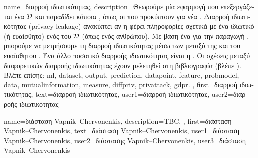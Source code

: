 {name={\foreignlanguage{greek}{διαρροή ιδιωτικότητας}},
	description={\foreignlanguage{greek}{Θεωρούμε μία εφαρμογή} 
		 \foreignlanguage{greek}{που επεξεργάζεται ένα}  $\mathcal{D}$ \foreignlanguage{greek}{και 
		παραδίδει κάποια} , \foreignlanguage{greek}{όπως οι}  \foreignlanguage{greek}{που 
		προκύπτουν για νέα} . \foreignlanguage{greek}{Διαρροή ιδιωτικότητας} (privacy leakage) 
		\foreignlanguage{greek}{ανακύπτει αν η}  \foreignlanguage{greek}{φέρει πληροφορίες σχετικά με ένα ιδιωτικό (ή 
		ευαίσθητο)}  \foreignlanguage{greek}{ενός}  \foreignlanguage{greek}{του $\mathcal{D}$ (όπως 
		ενός ανθρώπου). Με βάση ένα}  \foreignlanguage{greek}{για την παραγωγή} , 
		\foreignlanguage{greek}{μπορούμε να μετρήσουμε τη διαρροή ιδιωτικότητας μέσω των}  
		\foreignlanguage{greek}{μεταξύ της}  \foreignlanguage{greek}{και του ευαίσθητου} . 
		\foreignlanguage{greek}{Ένα άλλο ποσοτικό}  \foreignlanguage{greek}{διαρροής ιδιωτικότητας είναι η} 
		. \foreignlanguage{greek}{Οι σχέσεις μεταξύ διαφορετικών}  
		\foreignlanguage{greek}{διαρροής ιδιωτικότητας έχουν μελετηθεί στη βιβλιογραφία (βλέπε} \cite{InfThDiffPriv}).
		\\
		\foreignlanguage{greek}{Βλέπε επίσης:} \gls{ml}, \gls{dataset}, \gls{output}, \gls{prediction}, \gls{datapoint}, \gls{feature}, \gls{probmodel}, 
		\gls{data}, \gls{mutualinformation}, \gls{measure}, \gls{diffpriv}, \gls{privattack}, \gls{gdpr}. }, 
	first={\foreignlanguage{greek}{διαρροή ιδιωτικότητας}}, 
	text={\foreignlanguage{greek}{διαρροή ιδιωτικότητας}},
	user1={\foreignlanguage{greek}{διαρροή ιδιωτικότητας}}, %
   	user2={\foreignlanguage{greek}{διαρροής ιδιωτικότητας}} %
}

{name={\foreignlanguage{greek}{διάσταση} Vapnik–Chervonenkis},
	description={TBC. },
	first={\foreignlanguage{greek}{διάσταση} Vapnik–Chervonenkis},
	text={\foreignlanguage{greek}{διάσταση} Vapnik–Chervonenkis},
	user1={\foreignlanguage{greek}{διάσταση} Vapnik–Chervonenkis}, %
	user2={\foreignlanguage{greek}{διάστασης} Vapnik–Chervonenkis}, %
	user3={\foreignlanguage{greek}{διάσταση} Vapnik–Chervonenkis} %
}

